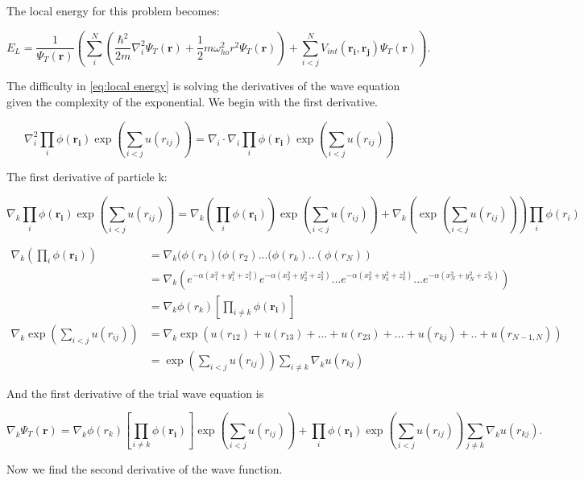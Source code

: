 The local energy for this problem becomes:


\begin{equation} \label{eq:local energy}
E_L = \frac{1}{\Psi_T(\boldsymbol{r})} \left( \sum_{i}^{N} \left(\frac{\hbar^2}{2m} \nabla_i^2 \Psi_T(\mathbf{r}) + \frac{1}{2} m\omega_{ho}^2 r^2 \Psi_T(\mathbf{r}) \right) + \sum_{i<j}^{N} V_{int}(\mathbf{r_i},\mathbf{r_j}) \Psi_T(\mathbf{r}) \right).
\end{equation}

The difficulty in \eqref{eq:local energy} is solving the derivatives of the wave equation given the complexity of the exponential. We begin with the first derivative.

$$\nabla_i^2 \prod_{i} \phi (\mathbf{r_i}) \exp \left(\sum_{i<j}u(r_{ij})\right) = \nabla_i \cdot \nabla_i \prod_{i} \phi (\mathbf{r_i}) \exp \left(\sum_{i<j}u(r_{ij})\right)$$

The first derivative of particle k:

$$\nabla_k \prod_{i} \phi (\mathbf{r_i}) \exp \left(\sum_{i<j}u(r_{ij})\right) = \nabla_k \left( \prod_{i} \phi (\mathbf{r_i}) \right) \exp \left(\sum_{i<j}u(r_{ij})\right) + \nabla_k \left(\exp \left(\sum_{i<j}u(r_{ij})\right)\right)  \prod_{i} \phi (r_i) $$

\begin{align*}
\nabla_k \left( \prod_{i} \phi (\mathbf{r_i}) \right) &= \nabla_k (\phi(r_1)(\phi(r_2)...(\phi(r_k)..(\phi(r_N)) \\
&=\nabla_k \left(e^{-\alpha (x_1^2 + y_1^2 + z_1^2)} e^{-\alpha (x_2^2 + y_2^2 + z_2^2)} ... e^{-\alpha (x_k^2 + y_k^2 + z_k^2)} ... e^{-\alpha (x_N^2 + y_N^2 + z_N^2)}\right)\\
&=\nabla_k \phi(r_k) \left[\prod_{i\ne k} \phi(\mathbf{r_i})\right]\\
\nabla_k \exp \left(\sum_{i<j}u(r_{ij})\right) &= \nabla_k \exp (u(r_{12}) + u(r_{13}) + ... + u(r_{23}) + ... + u(r_{kj}) + .. + u(r_{N-1,N}) )\\
&=\exp \left(\sum_{i<j}u(r_{ij})\right) \sum_{i\ne k} \nabla_k u(r_{kj})
\end{align*}

And the first derivative of the trial wave equation is

$$\nabla_k \Psi_T(\mathbf{r}) = \nabla_k \phi(r_k) \left[\prod_{i\ne k} \phi(\mathbf{r_i})\right] \exp \left(\sum_{i<j}u(r_{ij})\right) +  \prod_{i} \phi (\mathbf{r_i}) \exp \left(\sum_{i<j}u(r_{ij})\right) \sum_{j\ne k} \nabla_k u(r_{kj}).$$

Now we find the second derivative of the wave function.

